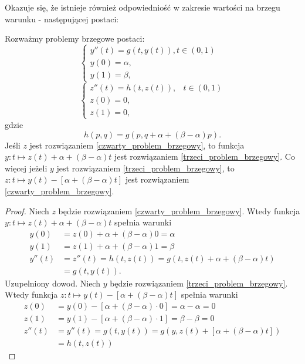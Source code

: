 Okazuje się, że istnieje również odpowiedniość w zakresie wartości na brzegu warunku - następującej postaci:
\begin{theorem}
Rozważmy problemy brzegowe postaci:
\begin{equation}\label{trzeci_problem_brzegowy}
\left\{\begin{array}{ll}
y''(t)=g(t,y(t)), t \in(0,1)& \\
y(0)=\alpha, & \\
y(1)=\beta,
\end{array}\right.
\end{equation}
\begin{equation}\label{czwarty_problem_brzegowy}
\left\{\begin{array}{ll}
z''(t)=h(t,z(t)), & t \in (0,1)\\
z(0)= 0, & \\
z(1)= 0,
\end{array}\right.
\end{equation}
gdzie 
$$
h(p,q)= g(p,q+\alpha + (\beta - \alpha)p).
$$
Jeśli $z$ jest rozwiązaniem \eqref{czwarty_problem_brzegowy}, to funkcja $y: t \mapsto z(t) + \alpha + (\beta - \alpha)t$ jest rozwiązaniem \eqref{trzeci_problem_brzegowy}. Co więcej jeżeli $y$ jest rozwiązaniem \eqref{trzeci_problem_brzegowy}, to $z: t \mapsto y(t) - [\alpha + (\beta - \alpha)t]$ jest rozwiązaniem \eqref{czwarty_problem_brzegowy}.
\end{theorem}
\begin{proof}
Niech $z$ będzie rozwiązaniem \eqref{czwarty_problem_brzegowy}. Wtedy funkcja $y: t \mapsto z(t) + \alpha + (\beta - \alpha)t$ spełnia warunki
\begin{align*}
y(0)&= z(0) + \alpha + (\beta - \alpha)0 = \alpha \\
y(1)&= z(1) + \alpha + (\beta - \alpha)1 = \beta \\
y''(t)&= z''(t) = h(t,z(t)) = g(t,z(t) + \alpha + (\beta - \alpha)t) \\
&= g(t,y(t)).
\end{align*}
{\color{red} Uzupelniony dowod.} Niech $y$ będzie rozwiązaniem \eqref{trzeci_problem_brzegowy}. Wtedy funkcja $z: t \mapsto y(t) - [\alpha + (\beta - \alpha)t]$ spełnia warunki 
\begin{align*}
z(0) &= y(0) - [\alpha + (\beta - \alpha)\cdot 0] = \alpha - \alpha = 0 \\
z(1) &= y(1) - [\alpha + (\beta - \alpha)\cdot 1] = \beta - \beta = 0 \\
z''(t) &= y''(t) = g(t,y(t)) = g(y, z(t) + [\alpha +(\beta - \alpha)t]) \\
&= h(t,z(t))
\end{align*} 
\end{proof}

